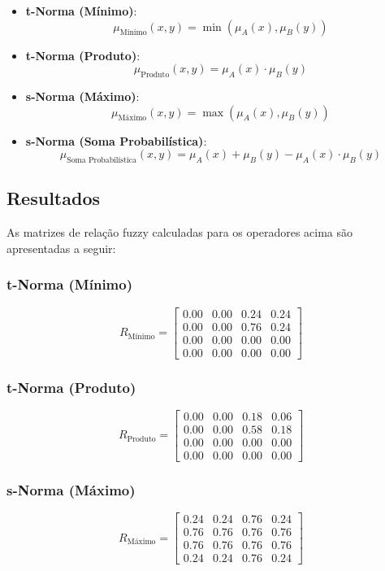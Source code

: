 \documentclass[a4paper,12pt]{article}
\begin{document}
\begin{itemize}
    \item \textbf{t-Norma (Mínimo)}:
    \[
    \mu_{\text{Mínimo}}(x, y) = \min(\mu_A(x), \mu_B(y))
    \]

    \item \textbf{t-Norma (Produto)}:
    \[
    \mu_{\text{Produto}}(x, y) = \mu_A(x) \cdot \mu_B(y)
    \]

    \item \textbf{s-Norma (Máximo)}:
    \[
    \mu_{\text{Máximo}}(x, y) = \max(\mu_A(x), \mu_B(y))
    \]

    \item \textbf{s-Norma (Soma Probabilística)}:
    \[
    \mu_{\text{Soma Probabilística}}(x, y) = \mu_A(x) + \mu_B(y) - \mu_A(x) \cdot \mu_B(y)
    \]
\end{itemize}

\subsection{Resultados}

As matrizes de relação fuzzy calculadas para os operadores acima são apresentadas a seguir:

\subsubsection{t-Norma (Mínimo)}
\[
R_{\text{Mínimo}} =
\begin{bmatrix}
0.00 & 0.00 & 0.24 & 0.24 \\
0.00 & 0.00 & 0.76 & 0.24 \\
0.00 & 0.00 & 0.00 & 0.00 \\
0.00 & 0.00 & 0.00 & 0.00
\end{bmatrix}
\]

\subsubsection{t-Norma (Produto)}
\[
R_{\text{Produto}} =
\begin{bmatrix}
0.00 & 0.00 & 0.18 & 0.06 \\
0.00 & 0.00 & 0.58 & 0.18 \\
0.00 & 0.00 & 0.00 & 0.00 \\
0.00 & 0.00 & 0.00 & 0.00
\end{bmatrix}
\]

\subsubsection{s-Norma (Máximo)}
\[
R_{\text{Máximo}} =
\begin{bmatrix}
0.24 & 0.24 & 0.76 & 0.24 \\
0.76 & 0.76 & 0.76 & 0.76 \\
0.76 & 0.76 & 0.76 & 0.76 \\
0.24 & 0.24 & 0.76 & 0.24
\end{bmatrix}
\]
\end{document}
